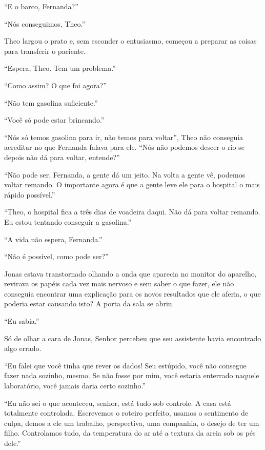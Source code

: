 ``E o barco, Fernanda?''

``Nós conseguimos, Theo.''

Theo largou o prato e, sem esconder o entusiasmo, começou a preparar as
coisas para transferir o paciente.

``Espera, Theo. Tem um problema.''

``Como assim? O que foi agora?''

``Não tem gasolina suficiente.''

``Você só pode estar brincando.''

``Nós só temos gasolina para ir, não temos para voltar'', Theo não
conseguia acreditar no que Fernanda falava para ele. ``Nós não podemos
descer o rio se depois não dá para voltar, entende?''

``Não pode ser, Fernanda, a gente dá um jeito. Na volta a gente vê,
podemos voltar remando. O importante agora é que a gente leve ele para o
hospital o mais rápido possível.''

``Theo, o hospital fica a três dias de voadeira daqui. Não dá para
voltar remando. Eu estou tentando conseguir a gasolina.''

``A vida não espera, Fernanda.''

\asterisc


``Não é possível, como pode ser?''

Jonas estava transtornado olhando a onda que aparecia no monitor do
aparelho, revirava os papéis cada vez mais nervoso e sem saber o que
fazer, ele não conseguia encontrar uma explicação para os novos
resultados que ele aferia, o que poderia estar causando isto? A porta da
sala se abriu.

``Eu sabia.''

Só de olhar a cara de Jonas, Senhor  percebeu que seu assistente havia
encontrado algo errado.

``Eu falei que você tinha que rever os dados! Seu estúpido, você não
consegue fazer nada sozinho, mesmo. Se não fosse por mim, você estaria
enterrado naquele laboratório, você jamais daria certo sozinho.''

``Eu não sei o que aconteceu, senhor, está tudo sob controle. A casa
está totalmente controlada. Escrevemos o roteiro perfeito, usamos o
sentimento de culpa, demos a ele um trabalho, perspectiva, uma
companhia, o desejo de ter um filho. Controlamos tudo, da temperatura do
ar até a textura da areia sob os pés dele.''


